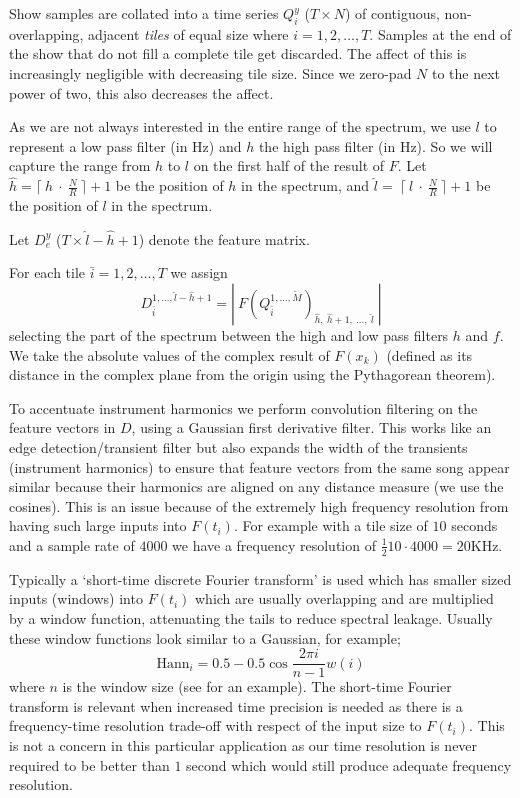 \documentclass[twocolumn]{article}
\begin{document}
	Show samples are collated into a time series $Q_i^y$ ($T \times N$) of contiguous, non-overlapping, adjacent \emph{tiles} of equal size where $i=1,2,\ldots, T$. Samples at the end of the show that do not fill a complete tile get discarded. The affect of this is increasingly negligible with decreasing tile size. Since we zero-pad $N$ to the next power of two, this also decreases the affect.
	
	As we are not always interested in the entire range of the spectrum, we use $l$ to represent a low pass filter (in Hz) and $h$ the high pass filter (in Hz). So we will capture the range from $h$ to $l$ on the first half of the result of $F$. Let $\hat{h} = \lceil~h~\cdot~\frac{{N}}{R} ~\rceil+1$ be the position of $h$ in the spectrum, and $\hat l=~\lceil~l~\cdot~\frac{{N}}{R}~\rceil+1$ be the position of $l$ in the spectrum.
	
	Let $D_e^y$ ($T \times \hat{l}-\hat{h}+1$) denote the feature matrix.
	
	For each tile $\bar{i}=1,2,\ldots,T$ we assign 
\[
D_{\bar{i}}^{1,\ldots,\hat{l}-\hat{h}+1} = \left|~F(Q_{\bar{i}}^{1,\ldots,\tilde{M}})_{\hat{h},~\hat{h}+1,~\ldots,~\hat{l} }~\right|
\]
 selecting the part of the spectrum between the high and low pass filters $h$ and $f$.  We take the absolute values of the complex result of $F(x_k)$ (defined as its distance in the complex plane from the origin using the Pythagorean theorem).
	
	To accentuate instrument harmonics we perform convolution filtering on the feature vectors in $D$, using a Gaussian first derivative filter. This works like an edge detection/transient filter but also expands the width of the transients (instrument harmonics) to ensure that feature vectors from the same song appear similar because their harmonics are aligned on any distance measure (we use the cosines). This is an issue because of the extremely high frequency resolution from having such large inputs into $F(t_i)$. For example with a tile size of $10$ seconds and a sample rate of $4000$ we have a frequency resolution of $\frac{1}{2}10 \cdot 4000 = 20$KHz. 
	
	Typically a `short-time discrete Fourier transform' is used which has smaller sized inputs (windows) into $F(t_i)$ which are usually overlapping and are multiplied by a window function, attenuating the tails to reduce spectral leakage. Usually these window functions look similar to a Gaussian, for example;  
	\[
	\mathrm{Hann}_i = 0.5 - 0.5 \cos\frac{2\pi i}{n-1}{w(i)}
	\] where $n$ is the window size
	(see \cite{tzanetakis1999multifeature} for an example). The short-time Fourier transform is relevant when increased time precision is needed as there is a frequency-time resolution trade-off with respect of the input size to $F(t_i)$. This is not a concern in this particular application as our time resolution is never required to be better than $1$ second which would still produce adequate frequency resolution.
	
\end{document}

